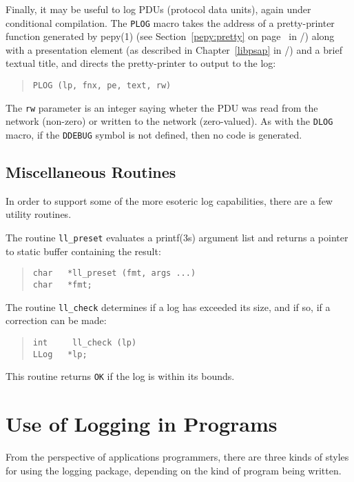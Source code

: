 Finally, it may be useful to log PDUs (protocol data units), again under
conditional compilation.
The \verb"PLOG" macro takes the address of a pretty-printer function generated
by \man pepy(1)
(see Section~\ref{pepy:pretty} on page~\pageref{pepy:pretty} in \volfour/)
along with a presentation element
(as described in Chapter~\ref{libpsap} in \volone/)
and a brief textual title, and directs the pretty-printer to output to the log:
\begin{quote}\small\begin{verbatim}
PLOG (lp, fnx, pe, text, rw)
\end{verbatim}\end{quote}
The \verb"rw" parameter is an integer saying wheter the PDU was read from the
network (non-zero) or written to the network (zero-valued).
As with the \verb"DLOG" macro,
if the \verb"DDEBUG" symbol is not defined,
then no code is generated.

\subsection	{Miscellaneous Routines}
In order to support some of the more esoteric log capabilities,
there are a few utility routines.

The routine \verb"ll_preset" evaluates a \man printf(3s) argument list
and returns a pointer to static buffer containing the result:
\begin{quote}\small\begin{verbatim}
char   *ll_preset (fmt, args ...)
char   *fmt;
\end{verbatim}
\end{quote}

The routine \verb"ll_check" determines if a log has exceeded its size,
and if so, if a correction can be made:
\begin{quote}\small\begin{verbatim}
int     ll_check (lp)
LLog   *lp;
\end{verbatim}
\end{quote}
This routine returns \verb"OK" if the log is within its bounds.

\section	{Use of Logging in Programs}
From the perspective of applications programmers,
there are three kinds of styles for using the logging package,
depending on the kind of program being written.

